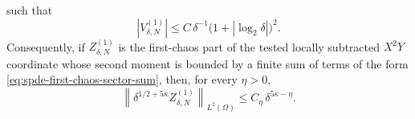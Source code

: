\begin{proposition}
such that
\begin{equation}
  |V_{\delta,N}^{(1)}|
  \leq
  C\,\delta^{-1}
  \bigl(1+|\log_2\delta|\bigr)^2 .
  \label{eq:spde-first-chaos-logarithmic-variance-bound}
\end{equation}
Consequently, if \(Z_{\delta,N}^{(1)}\) is the first-chaos part of the
tested locally subtracted \(X^2Y\) coordinate whose second moment is bounded
by a finite sum of terms of the form
\eqref{eq:spde-first-chaos-sector-sum}, then, for every
\(\eta>0\),
\begin{equation}
  \left\|
    \delta^{1/2+5\kappa} Z_{\delta,N}^{(1)}
  \right\|_{L^2(\Omega)}
  \leq
  C_\eta\,\delta^{5\kappa-\eta}.
  \label{eq:spde-first-chaos-normalized-log-loss}
\end{equation}
\end{proposition}

